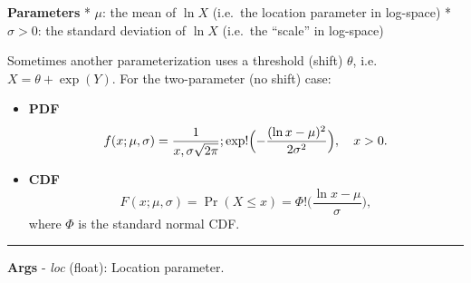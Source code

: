 \documentclass[
  letterpaper,
  DIV=11,
  numbers=noendperiod]{scrartcl}
\begin{document}
\textbf{Parameters} * \(\mu\): the mean of \(\ln X\) (i.e.~the location
parameter in log-space) * \(\sigma > 0\): the standard deviation of
\(\ln X\) (i.e.~the ``scale'' in log-space)

Sometimes another parameterization uses a threshold (shift) \(\theta\),
i.e.~\(X = \theta + \exp(Y)\). For the two-parameter (no shift) case:

\begin{itemize}
\item
  \textbf{PDF} \[
  f(x; \mu, \sigma) = \frac{1}{x,\sigma\sqrt{2\pi}} ; \exp!\Bigl( -\frac{(\ln x - \mu)^2}{2\sigma^2} \Bigr), \quad x > 0.
  \]
\item
  \textbf{CDF} \[
  F(x; \mu, \sigma) = \Pr(X \le x) = \Phi!\bigl( \frac{\ln x - \mu}{\sigma} \bigr),
  \] where \(\Phi\) is the standard normal CDF.
\end{itemize}

\begin{center}\rule{0.5\linewidth}{0.5pt}\end{center}

\textbf{Args} - \emph{loc} (float): Location parameter.
\end{document}
